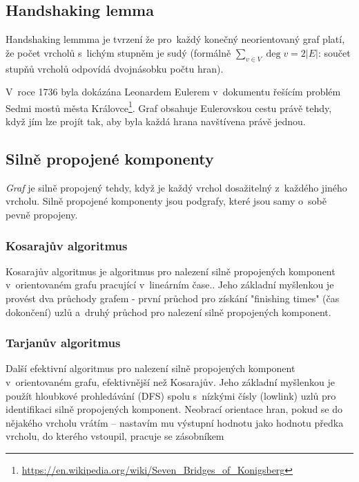 \subsection{Handshaking lemma}

Handshaking lemmma je tvrzení že pro~každý konečný neorientovaný graf platí, že počet vrcholů s~lichým stupněm je sudý (formálně $\sum_{v \in V} \deg v = 2 |E|$: součet stupňů vrcholů odpovídá dvojnásobku počtu hran).

V~roce 1736 byla dokázána Leonardem Eulerem v~dokumentu řešícím problém Sedmi mostů města Královce\footnote{\url{https://en.wikipedia.org/wiki/Seven_Bridges_of_Konigsberg}}.
Graf obsahuje Eulerovskou cestu právě tehdy, když jím lze projít tak, aby byla každá hrana navštívena právě jednou.

\subsection{Silně propojené komponenty}

\emph{Graf} je silně propojený tehdy, když je každý vrchol dosažitelný z~každého jiného vrcholu.
Silně propojené komponenty jsou podgrafy, které jsou samy o~sobě pevně propojeny.

\subsubsection{Kosarajův algoritmus}

Kosarajův algoritmus je algoritmus pro nalezení silně propojených komponent v~orientovaném grafu pracující v~lineárním čase.. Jeho základní myšlenkou je provést dva průchody grafem - první průchod pro získání "finishing times" (čas dokončení) uzlů a~druhý průchod pro nalezení silně propojených komponent.


\subsubsection{Tarjanův algoritmus}

Další efektivní algoritmus pro nalezení silně propojených komponent v~orientovaném grafu, efektivnější než Kosarajův. Jeho základní myšlenkou je použít hloubkové prohledávání (DFS) spolu s~nízkými čísly (lowlink) uzlů pro identifikaci silně propojených komponent. Neobrací orientace hran, pokud se do nějakého vrcholu vrátím -- nastavím mu výstupní hodnotu jako hodnotu předka vrcholu, do kterého vstoupil, pracuje se zásobníkem

